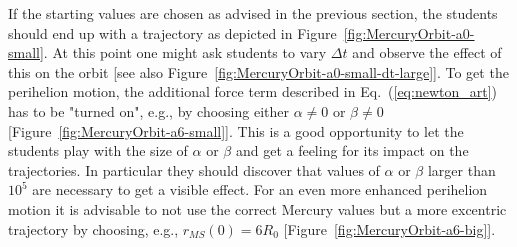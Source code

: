 \documentclass[12pt,ngerman,american]{iopart}
\begin{document}
If the starting values are chosen as advised in the previous section, the students should end up with a trajectory as depicted in Figure~\ref{fig:MercuryOrbit-a0-small}.
At this point one might ask students to vary $\Delta t$ and observe the effect of this on the orbit [see also Figure~\ref{fig:MercuryOrbit-a0-small-dt-large}].
To get the perihelion motion, the additional force term described in Eq.~(\ref{eq:newton_art}) has to be "turned on", e.g., by choosing either $\alpha\neq0$ or $\beta\neq0$
[Figure~\ref{fig:MercuryOrbit-a6-small}].
This is a good opportunity to let the students play with the size of $\alpha$ or $\beta$ and get a feeling for its impact on the trajectories. In particular
they should discover that values of $\alpha$ or $\beta$ larger than $10^5$ are necessary to get a visible effect.
For an even more enhanced perihelion motion it is advisable to not use the correct Mercury values but a more excentric trajectory by choosing, e.g., $r_{MS}(0)=6R_0$ [Figure~\ref{fig:MercuryOrbit-a6-big}].
\end{document}
